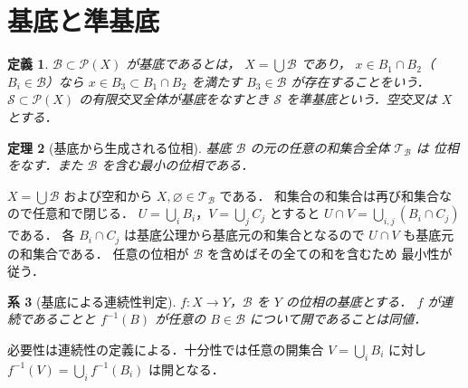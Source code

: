 \documentclass[a5paper,10pt,onecolumn]{jsarticle}
\makeatletter
\theoremstyle{mathnotetheorem}
\newtheorem{theorem}{定理}[section]
\newtheorem{definition}[theorem]{定義}
\newtheorem{corollary}[theorem]{系}
\renewcommand{\proofname}{証明}
\renewenvironment{proof}[1][\proofname]{%
  \par\pushQED{\qed}\normalfont\topsep4\p@\@plus2\p@\relax
  \trivlist\item[\hskip\labelsep\bfseries #1]\ignorespaces
}{\popQED\endtrivlist\@endpefalse}
\makeatother
\begin{document}
\section{基底と準基底}
\begin{definition}
$\mathcal B\subset\mathcal P(X)$ が基底であるとは，
$X=\bigcup\mathcal B$ であり，
$x\in B_1\cap B_2$（$B_i\in\mathcal B$）なら
$x\in B_3\subset B_1\cap B_2$ を満たす
$B_3\in\mathcal B$ が存在することをいう．
$\mathcal S\subset\mathcal P(X)$ の有限交叉全体が基底をなすとき
$\mathcal S$ を準基底という．空交叉は $X$ とする．
\end{definition}
\begin{theorem}[基底から生成される位相]\label{thm:basis}
基底 $\mathcal B$ の元の任意の和集合全体 $\mathcal T_{\mathcal B}$ は
位相をなす．また $\mathcal B$ を含む最小の位相である．
\end{theorem}
\begin{proof}
$X=\bigcup\mathcal B$ および空和から
$X,\varnothing\in\mathcal T_{\mathcal B}$ である．
和集合の和集合は再び和集合なので任意和で閉じる．
$U=\bigcup_iB_i$，$V=\bigcup_jC_j$ とすると
$U\cap V=\bigcup_{i,j}(B_i\cap C_j)$ である．
各 $B_i\cap C_j$ は基底公理から基底元の和集合となるので
$U\cap V$ も基底元の和集合である．
任意の位相が $\mathcal B$ を含めばその全ての和を含むため
最小性が従う．
\end{proof}
\begin{corollary}[基底による連続性判定]
$f:X\to Y$，$\mathcal B$ を $Y$ の位相の基底とする．
$f$ が連続であることと
$f^{-1}(B)$ が任意の $B\in\mathcal B$ について開であることは同値．
\end{corollary}
\begin{proof}
必要性は連続性の定義による．十分性では任意の開集合
$V=\bigcup_iB_i$ に対し
$f^{-1}(V)=\bigcup_i f^{-1}(B_i)$ は開となる．
\end{proof}
\end{document}
